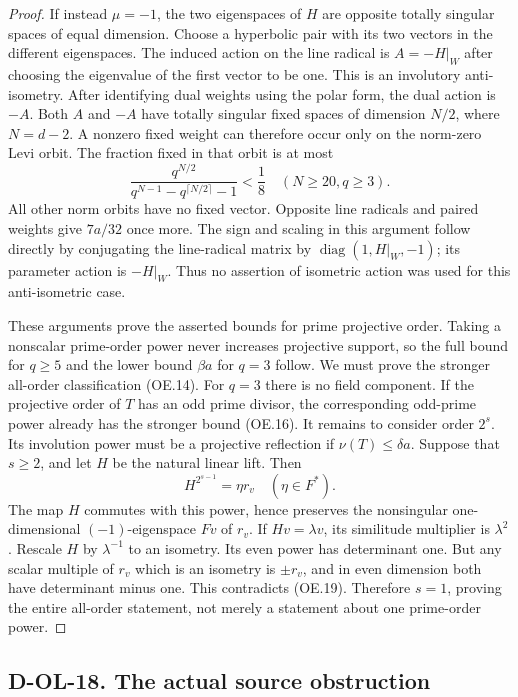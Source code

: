 \begin{proof}
If instead $\mu=-1$, the two eigenspaces of $H$ are opposite
totally singular spaces of equal dimension.  Choose a
hyperbolic pair with its two vectors in the different
eigenspaces.  The induced action on the line radical is
$A=-H|_W$ after choosing the eigenvalue of the first vector
to be one.  This is an involutory anti-isometry.  After
identifying dual weights using the polar form, the dual
action is $-A$.  Both $A$ and $-A$ have totally singular
fixed spaces of dimension $N/2$, where $N=d-2$.
A nonzero fixed weight can therefore occur only
on the norm-zero Levi orbit.  The fraction fixed in that
orbit is at most
\[
 \frac{q^{N/2}}{q^{N-1}-q^{\lceil N/2\rceil}-1}<\frac18
 \quad(N\ge20,q\ge3).
 \tag{OE.18}
\]
All other norm orbits have no fixed vector.  Opposite line
radicals and paired weights give $7a/32$ once more.  The
sign and scaling in this argument follow directly by
conjugating the line-radical matrix by
$\operatorname{diag}(1,H|_W,-1)$; its parameter action is
$-H|_W$.  Thus no assertion of isometric action was used
for this anti-isometric case.

These arguments prove the asserted bounds for prime
projective order.  Taking a nonscalar prime-order power
never increases projective support, so the full bound
for $q\ge5$ and the lower bound $\beta a$ for $q=3$ follow.
We must prove the stronger all-order classification (OE.14).
For $q=3$ there is no field component.  If the projective
order of $T$ has an odd prime divisor, the corresponding
odd-prime power already has the stronger bound (OE.16).
It remains to consider order $2^s$.  Its involution power
must be a projective reflection if $\nu(T)\le\delta a$.
Suppose that $s\ge2$, and let $H$ be the natural linear lift.
Then
\[
                         H^{2^{s-1}}=\eta r_v
                         \quad(\eta\in F^*).
                         \tag{OE.19}
\]
The map $H$ commutes with this power, hence preserves the
nonsingular one-dimensional $(-1)$-eigenspace $Fv$ of $r_v$.
If $Hv=\lambda v$, its similitude multiplier is $\lambda^2$.
Rescale $H$ by $\lambda^{-1}$ to an isometry.  Its even
power has determinant one.  But any scalar multiple of
$r_v$ which is an isometry is $\pm r_v$, and in even
dimension both have determinant minus one.  This
contradicts (OE.19).  Therefore $s=1$, proving the entire
all-order statement, not merely a statement about one
prime-order power.
\end{proof}

\subsection*{D-OL-18. The actual source obstruction}

